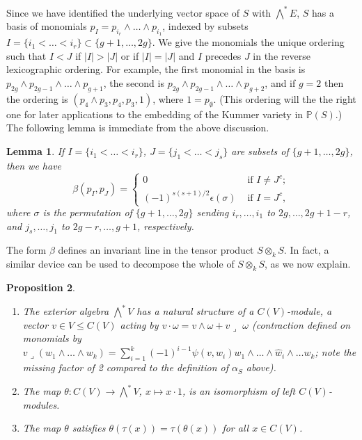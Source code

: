 \documentclass{article} %
\newtheorem{proposition}{Proposition}[section]
\newtheorem{lemma}[proposition]{Lemma}
\numberwithin{equation}{section}
\renewcommand{\P}{\mathbb{P}}
\begin{document}
Since we have identified the underlying vector space of $S$ with $\bigwedge^\ast E$, $S$ has a basis of monomials $p_I = p_{i_r} \wedge \dots \wedge p_{i_1}$, indexed by subsets $I = \{ i_1 < \dots < i_r \} \subset \{g+1, \dots, 2g\}$. We give the monomials the unique ordering such that $I < J$ if $|I| > |J|$ or if $|I| = |J|$ and $I$ precedes $J$ in the reverse lexicographic ordering. 
For example, the first monomial in the basis is $p_{2g} \wedge p_{2g-1} \wedge \dots \wedge p_{g+1}$, the second is $p_{2g} \wedge p_{2g-1} \wedge \dots \wedge p_{g+2}$, and if $g=2$ then the ordering is $(p_4 \wedge p_3, p_4, p_3, 1)$, where $1  = p_{\emptyset}$.
(This ordering will the the right one for later applications to the embedding of the Kummer variety in $\P(S)$.) The following lemma is immediate from the above discussion.
\begin{lemma}\label{lem_computation_of_beta}
    If $I = \{ i_1 < \dots < i_r \}$, $J = \{ j_1 < \dots < j_s \}$ are subsets of $\{ g+1, \dots, 2g \}$, then we have
    \[ \beta(p_I, p_J) = \left\{ \begin{array}{cc} 0 & \text{ if } I \neq J^c; \\
    (-1)^{s(s+1)/2} \epsilon(\sigma)  & \text{ if }I = J^c, \end{array}\right. \]
    where $\sigma$ is the permutation of $\{ g+1, \dots, 2g \}$ sending $i_r, \dots, i_1$ to $2g, \dots, 2g+1-r$, and $j_s, \dots, j_1$ to $2g-r, \dots, g+1$, respectively. 
\end{lemma}
The form $\beta$ defines an invariant line in the tensor product $S \otimes_k S$. In fact, a similar device can be used to decompose the whole of $S \otimes_k S$, as we now explain. 
\begin{proposition}
    \begin{enumerate}
        \item The exterior algebra $\bigwedge^\ast V$ has a natural structure of a $C(V)$-module, a vector $v \in V \leq C(V)$ acting by $v \cdot \omega = v \wedge \omega + v \lrcorner \,\,\omega$ (contraction defined on monomials by $v \lrcorner (w_1 \wedge \dots \wedge w_k) = \sum_{i=1}^k (-1)^{i-1} \psi(v, w_i) w_1 \wedge \dots \wedge \hat{w}_i \wedge \dots w_k$; note the missing factor of 2 compared to the definition of $\alpha_S$ above). 
        \item The map $\theta : C(V) \to \bigwedge^\ast V$, $x \mapsto x \cdot 1$, is an isomorphism of left $C(V)$-modules.
        \item The map $\theta$ satisfies $\theta(\tau(x)) = \tau(\theta(x))$ for all $x \in C(V)$. 
    \end{enumerate}
\end{proposition}
\end{document}
